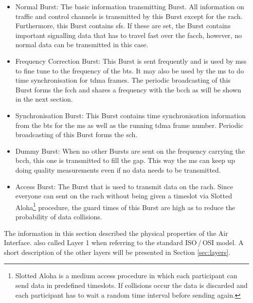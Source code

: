 \begin{itemize}
	\item Normal Burst: The basic information transmitting Burst.
	All information on traffic and control channels is transmitted by this Burst except for the \gls{rach}.
	Furthermore, this Burst contains \glspl{sf}.
	If these are set, the Burst contains important signalling data that has to travel fast over the \gls{facch}, however, no normal data can be transmitted in this case.
	\item Frequency Correction Burst: This Burst is sent frequently and is used by \glspl{ms} to fine tune to the frequency of the \gls{bts}.
	It may also be used by the \gls{ms} to do time synchronisation for \gls{tdma} frames.
	The periodic broadcasting of this Burst forms the \gls{fcch} and shares a frequency with the \gls{bcch} as will be shown in the next section.
	\item Synchronisation Burst: This Burst contains time synchronisation information from the \gls{bts} for the \gls{ms} as well as the running \gls{tdma} frame number.
	Periodic broadcasting of this Burst forms the \gls{sch}.
	\item Dummy Burst: When no other Bursts are sent on the frequency carrying the \gls{bcch}, this one is transmitted to fill the gap.
	This way the \gls{ms} can keep up doing quality measurements even if no data needs to be transmitted.
	\item Access Burst: The Burst that is used to transmit data on the \gls{rach}.
	Since everyone can sent on the \gls{rach} without being given a timeslot via Slotted Aloha\footnote{Slotted Aloha is a medium access procedure in which each participant can send data in predefined timeslots. If collisions occur the data is discarded and each participant has to wait a random time interval before sending again.} procedure, the guard times of this Burst are high as to reduce the probability of data collisions.
\end{itemize}

The information in this section described the physical properties of the Air Interface. also called Layer 1 when referring to the standard ISO\,/\,OSI model.
A short description of the other layers will be presented in Section \ref{sec:layers}.

